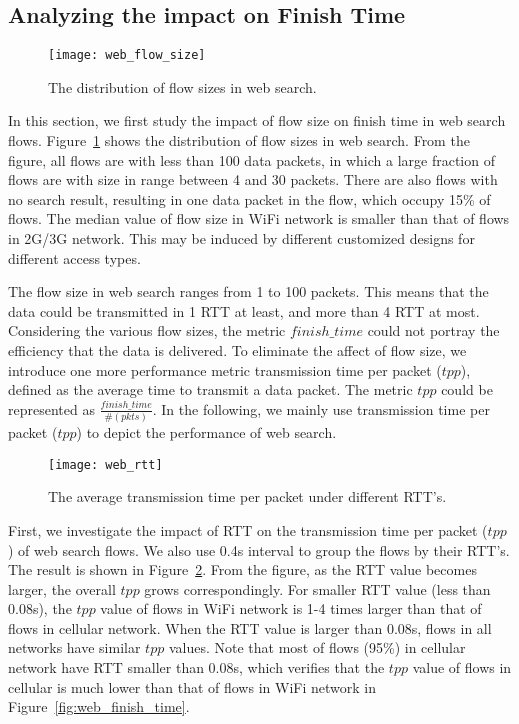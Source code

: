 \subsection{Analyzing the impact on Finish Time}

\begin{figure}[th]
\centering
	\texttt{[image: web\_flow\_size]}
\caption{The distribution of flow sizes in web search.}
\label{fig:web_flow_size}
\end{figure}

In this section, we first study the impact of flow size on finish time in web search flows. Figure~\ref{fig:web_flow_size} shows the distribution of flow sizes in web search.  From the figure, all flows are with less than 100 data packets, in which a large fraction of flows are with size in range between 4 and 30 packets. There are also flows with no search result, resulting in one data packet in the flow, which occupy 15\% of flows. The median value of flow size in WiFi network is smaller than that of flows in 2G/3G network. This may be induced by different customized designs for different access types.

The flow size in web search ranges from 1 to 100 packets. This means that the data could be transmitted in 1 RTT at least, and more than 4 RTT at most. Considering the various flow sizes, the metric $finish\_time$ could not portray the efficiency that the data is delivered. To eliminate the affect of flow size, we introduce one more performance metric transmission time per packet ($tpp$), defined as the average time to transmit a data packet. The metric $tpp$ could be represented as $\frac{finish\_time}{\#(pkts)}$. In the following, we mainly use transmission time per packet ($tpp$) to depict the performance of web search.

\begin{figure}[th]
\centering
\texttt{[image: web\_rtt]}
\caption{The average transmission time per packet under different RTT's.}
\label{fig:web_rtt}
\end{figure}

First, we investigate the impact of RTT on the transmission time per packet ($tpp$) of web search flows. We also use 0.4s interval to group the flows by their RTT's. The result is shown in Figure~\ref{fig:web_rtt}. From the figure, as the RTT value becomes larger, the overall $tpp$ grows correspondingly. For smaller RTT value (less than 0.08s), the $tpp$ value of flows in WiFi network is 1-4 times larger than that of flows in cellular network. When the RTT value is larger than 0.08s, flows in all networks have similar $tpp$ values. Note that most of flows (95\%) in cellular network have RTT smaller than 0.08s, which verifies that the $tpp$ value of flows in cellular is much lower than that of flows in WiFi network in Figure~\ref{fig:web_finish_time}.

